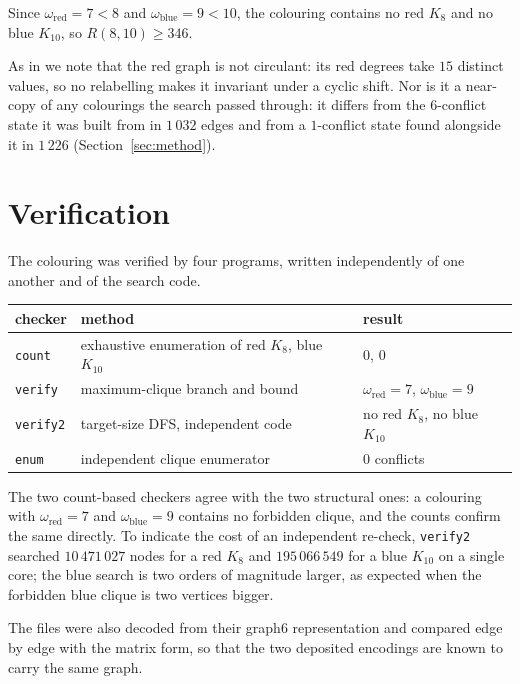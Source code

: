 \documentclass[11pt]{article}
\newcommand{\R}{R}
\newcommand{\omegared}{\omega_{\mathrm{red}}}
\newcommand{\omegablue}{\omega_{\mathrm{blue}}}
\begin{document}
Since $\omegared=7<8$ and $\omegablue=9<10$, the colouring contains no red $K_8$ and no blue
$K_{10}$, so $\R(8,10)\ge 346$.

As in \cite{cremer} we note that the red graph is not circulant: its red degrees take $15$ distinct
values, so no relabelling makes it invariant under a cyclic shift. Nor is it a near-copy of any
colourings the search passed through: it differs from the $6$-conflict state it was built from in
$1\,032$ edges and from a $1$-conflict state found alongside it in $1\,226$ (Section~\ref{sec:method}).

\section{Verification}\label{sec:verification}

The colouring was verified by four programs, written independently of one another and of the search
code.

\begin{center}
\small
\begin{tabular}{@{}lll@{}}
\toprule
checker & method & result\\
\midrule
\texttt{count} & exhaustive enumeration of red $K_8$, blue $K_{10}$ & $0$, $0$\\
\texttt{verify} & maximum-clique branch and bound & $\omegared=7$, $\omegablue=9$\\
\texttt{verify2} & target-size DFS, independent code & no red $K_8$, no blue $K_{10}$\\
\texttt{enum} & independent clique enumerator & $0$ conflicts\\
\bottomrule
\end{tabular}
\end{center}

The two count-based checkers agree with the two structural ones: a colouring with $\omegared=7$ and
$\omegablue=9$ contains no forbidden clique, and the counts confirm the same directly. To indicate the
cost of an independent re-check, \texttt{verify2} searched $10\,471\,027$ nodes for a red $K_8$ and
$195\,066\,549$ for a blue $K_{10}$ on a single core; the blue search is two orders of magnitude
larger, as expected when the forbidden blue clique is two vertices bigger.

The files were also decoded from their graph6 representation \cite{networkx} and compared edge by
edge with the matrix form, so that the two deposited encodings are known to carry the same graph.
\end{document}
